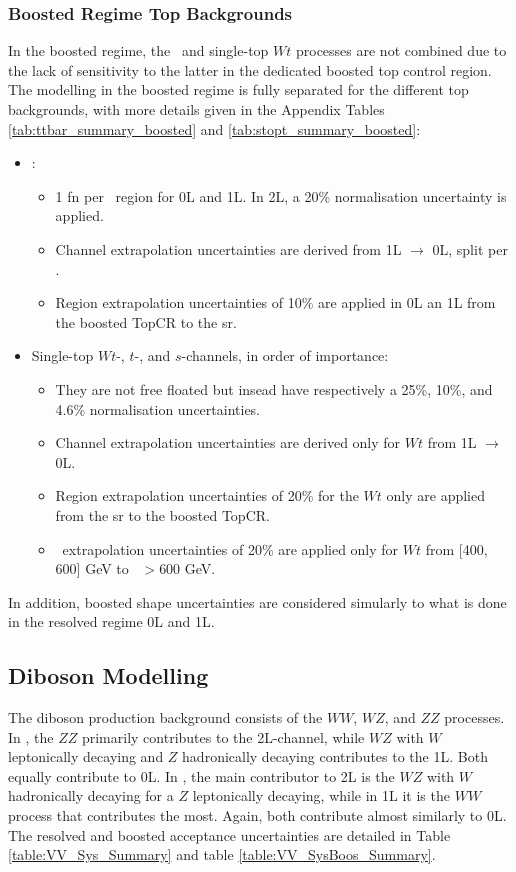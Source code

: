 \subsubsection{Boosted Regime Top Backgrounds} 
In the boosted regime, the \ttb\ and single-top $Wt$ processes are not combined due to the lack of sensitivity to the latter in the dedicated boosted top control region. The modelling in the boosted regime is fully separated for the different top backgrounds, with more details given in the Appendix Tables \ref{tab:ttbar_summary_boosted} and \ref{tab:stopt_summary_boosted}:
\begin{itemize}[leftmargin=*]
    \item \ttb: 
    \begin{itemize}
        \item 1 \gls{fn} per \ptv\ region for 0L and 1L. In 2L, a 20\% normalisation uncertainty is applied. 
        \item Channel extrapolation uncertainties are derived from 1L $\rightarrow$ 0L, split per \ptv.
        \item Region extrapolation uncertainties of 10\% are applied in 0L an 1L from the boosted TopCR to the \gls{sr}.
    \end{itemize}
    \item Single-top $Wt$-, $t$-, and $s$-channels, in order of importance:
    \begin{itemize}
        \item They are not free floated but insead have respectively a 25\%, 10\%, and 4.6\% normalisation uncertainties. %
        \item Channel extrapolation uncertainties are derived only for $Wt$ from 1L $\rightarrow$ 0L.
        \item Region extrapolation uncertainties of 20\% for the $Wt$ only are applied from the \gls{sr} to the boosted TopCR.
        \item \ptv\ extrapolation uncertainties of 20\% are applied only for $Wt$ from [400, 600] GeV to \ptv\ $> 600$ GeV. 
    \end{itemize}
\end{itemize}
In addition, boosted shape uncertainties are considered simularly to what is done in the resolved regime 0L and 1L.

\subsection{Diboson Modelling}
The diboson production background consists of the $WW$, $WZ$, and $ZZ$ processes. In \vhb, the $ZZ$ primarily contributes to the 2L-channel, while $WZ$ with $W$ leptonically decaying and $Z$ hadronically decaying contributes to the 1L. Both equally contribute to 0L. In \vhc, the main contributor to 2L is the $WZ$ with $W$ hadronically decaying for a $Z$ leptonically decaying, while in 1L it is the $WW$ process that contributes the most. Again, both contribute almost similarly to 0L. The resolved and boosted acceptance uncertainties are detailed in Table \ref{table:VV_Sys_Summary} and table \ref{table:VV_SysBoos_Summary}. \\


